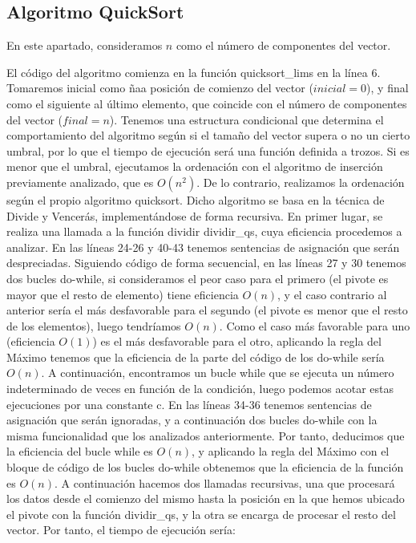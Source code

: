 \documentclass{homework}
\begin{document}
    \subsection{Algoritmo QuickSort}
    
     

    En este apartado, consideramos $n$ como el número de componentes del vector. 

    El código del algoritmo comienza en la función quicksort\_lims en la línea 6. Tomaremos inicial 
    como ñaa posición de comienzo del vector ($inicial = 0$), y final como el siguiente al último elemento, 
    que coincide con el número de componentes del vector ($final = n$).
    Tenemos una estructura condicional que determina el comportamiento del algoritmo según si el tamaño del vector 
    supera o no un cierto umbral, por lo que el tiempo de ejecución será una función definida a trozos. Si es menor 
    que el umbral, ejecutamos la ordenación con el algoritmo de inserción previamente analizado, que es $O(n^2)$. De lo
    contrario, realizamos la ordenación según el propio algoritmo quicksort. Dicho algoritmo se basa en la técnica de Divide
    y Vencerás, implementándose de forma recursiva. En primer lugar, se realiza una llamada a la función dividir dividir\_qs, 
    cuya eficiencia procedemos a analizar. En las líneas 24-26 y 40-43 tenemos sentencias de asignación que serán despreciadas. 
    Siguiendo código de forma secuencial, en las líneas 27 y 30 tenemos dos bucles do-while, si consideramos el peor caso para 
    el primero (el pivote es mayor que el resto de elemento) tiene eficiencia $O(n)$, y el caso contrario al anterior sería el 
    más desfavorable para el segundo (el pivote es menor que el resto de los elementos), luego tendríamos $O(n)$. Como el caso más 
    favorable para uno (eficiencia $O(1)$) es el más desfavorable para el otro, aplicando la regla del Máximo tenemos que la 
    eficiencia de la parte del código de los do-while sería $O(n)$.  A continuación, encontramos un bucle while que se ejecuta un 
    número indeterminado de veces en función de la condición, luego podemos acotar estas ejecuciones por una constante c. En las 
    líneas 34-36 tenemos sentencias de asignación que serán ignoradas, y a continuación dos bucles do-while con la misma funcionalidad
    que los analizados anteriormente. Por tanto, deducimos que la eficiencia del bucle while es $O(n)$, y aplicando la regla del 
    Máximo con el bloque de código de los bucles do-while obtenemos que la eficiencia de la función es $O(n)$. A continuación hacemos dos llamadas
    recursivas, una que procesará los datos desde el comienzo del mismo hasta la posición en la que hemos ubicado el pivote con la 
    función dividir\_qs, y la otra se encarga de procesar el resto del vector. Por tanto, el tiempo de ejecución sería:
\end{document}
